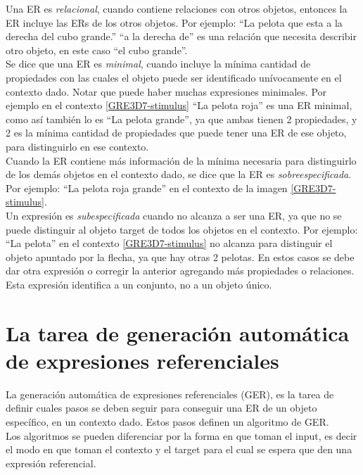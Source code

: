 Una ER es {\it relacional}, cuando contiene relaciones con otros objetos, entonces la ER incluye las ERs de los otros objetos.  Por ejemplo: ``La pelota que esta a la derecha del cubo grande.'' ``a la derecha de'' es una relaci\'on que necesita describir otro objeto, en este caso ``el cubo grande''.\\

Se dice que una ER es {\it minimal}, cuando incluye la m\'inima cantidad de propiedades con las cuales el objeto puede ser identificado un\'ivocamente en el contexto dado. Notar que puede haber muchas expresiones minimales. Por ejemplo en el contexto \ref{GRE3D7-stimulus} ``La pelota roja'' es una ER minimal, como as\'i tambi\'en lo es ``La pelota grande'', ya que ambas tienen 2 propiedades, y 2 es la m\'inima cantidad de propiedades que puede tener una ER de ese objeto, para distinguirlo en ese contexto.\\

Cuando la ER contiene m\'as informaci\'on de la m\'inima necesaria para distinguirlo de los dem\'as objetos en el contexto dado, se dice que la ER es {\it sobreespecificada}. Por ejemplo: ``La pelota roja grande'' en el contexto de la imagen \ref{GRE3D7-stimulus}.\\

Un expresi\'on es {\it subespecificada} cuando no alcanza a ser una ER, ya que no se puede distinguir al objeto target de todos los objetos en el contexto. Por ejemplo: ``La pelota'' en el contexto \ref{GRE3D7-stimulus} no alcanza para distinguir el objeto apuntado por la flecha, ya que hay otras 2 pelotas. En estos casos se debe dar otra expresi\'on o corregir la anterior agregando m\'as propiedades o relaciones. Esta expresi\'on identifica a un conjunto, no a un objeto \'unico.

\section{La tarea de generaci\'on autom\'atica de expresiones referenciales}

La generaci\'on autom\'atica de expresiones referenciales (GER), es la tarea de definir cuales pasos se deben seguir para conseguir una ER de un objeto espec\'ifico, en un contexto dado. Estos pasos definen un algoritmo de GER. \\

Los algoritmos se pueden diferenciar por la forma en que toman el input, es decir el modo en que toman el contexto y el target para el cual se espera que den una expresi\'on referencial. \\

